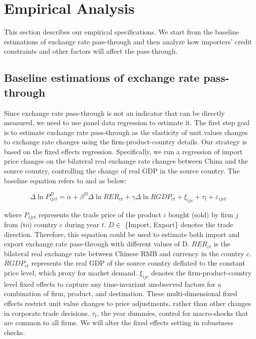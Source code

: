 \documentclass[12pt]{article}
\begin{document}
\section{Empirical Analysis} \label{Empirical}
This section describes our empirical specifications. We start from the baseline estimations of exchange rate pass-through and then analyze how importers' credit constraints and other factors will affect the pass-through. 

\subsection{Baseline estimations of exchange rate pass-through}

Since exchange rate pass-through is not an indicator that can be directly measured, we need to use panel data regression to estimate it. The first step goal is to estimate exchange rate pass-through as the elasticity of unit values changes to exchange rate changes using the firm-product-country details. Our strategy is based on the fixed effects regression. Specifically, we run a regression of import price changes on the bilateral real exchange rate changes between China and the source country, controlling the change of real GDP in the source country. The baseline equation refers to \cite{aik2014} and \cite{lmx2015} as below:

\begin{equation}
	\Delta \ln P^{D}_{i j c t}=\alpha+\beta^D \Delta \ln R E R_{c t}+\gamma \Delta \ln R G D P_{c t}+\xi_{i j c}+\tau_{t}+\varepsilon_{i j c t}
	\label{eq.baseline}
\end{equation}

where $P_{ijct}$ represents the trade price of the product $i$ bought (sold) by firm $j$ from (to) country $c$ during year $t$.  $D \in$ \{Import, Export\} denotes the trade direction. Therefore, this equation could be used to estimate both import and export exchange rate pass-through with different values of D. $R E R_{c t}$ is the bilateral real exchange rate between Chinese RMB and currency in the country $c$. $RGDP_{ct}$ represents the real GDP of the source country deflated to the constant price level, which proxy for market demand. $\xi_{ijc}$ denotes the firm-product-country level fixed effects to capture any time-invariant unobserved factors for a combination of firm, product, and destination. These multi-dimensional fixed effects restrict unit value changes to price adjustments, rather than other changes in corporate trade decisions. $\tau_t$, the year dummies, control for macro-shocks that are common to all firms. We will alter the fixed effects setting in robustness checks.
\end{document}
